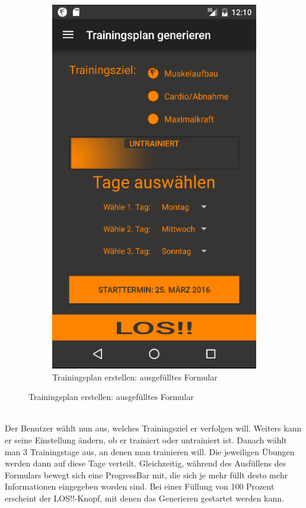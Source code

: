 \documentclass[FIPLY_base.tex]{subfiles}
\begin{document}
\begin{figure}[H]
\begin{subfigure}[b]{0.5\textwidth}
			\includegraphics[scale=0.5]{img/generieren2}
			\caption{Trainingsplan erstellen: ausgefülltes Formular}
		\end{subfigure}
	\end{figure}
	\ \\
	Der Benutzer wählt nun aus, welches Trainingsziel er verfolgen will. Weiters kann er seine Einstellung ändern, ob er trainiert oder untrainiert ist. Danach wählt man 3 Trainingstage aus, an denen man trainieren will. Die jeweiligen Übungen werden dann auf diese Tage verteilt. Gleichzeitig, während des Ausfüllens des Formulars bewegt sich eine ProgressBar mit, die sich je mehr füllt desto mehr Informationen eingegeben worden sind. Bei einer Füllung von 100 Prozent erscheint der \grqq{}LOS!!\grqq{}-Knopf, mit denen das Generieren gestartet werden kann. 
\end{document}
